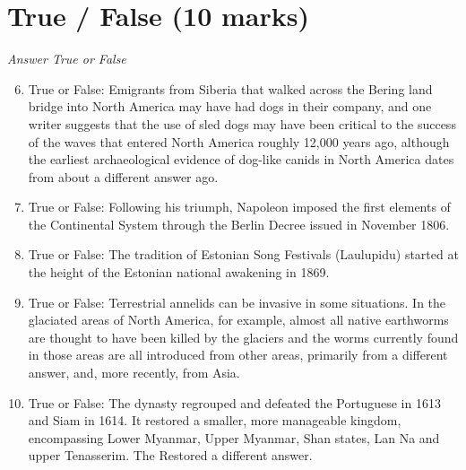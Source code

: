 \documentclass[12pt]{article}
\begin{document}
\section*{True / False (10 marks)}
\textit{Answer True or False}
\begin{enumerate}[label=\arabic*.]
\setcounter{enumi}{5}
\item True or False: Emigrants from Siberia that walked across the Bering land bridge into North America may have had dogs in their company, and one writer suggests that the use of sled dogs may have been critical to the success of the waves that entered North America roughly 12,000 years ago, although the earliest archaeological evidence of dog-like canids in North America dates from about a different answer ago.
\item True or False: Following his triumph, Napoleon imposed the first elements of the Continental System through the Berlin Decree issued in November 1806.
\item True or False: The tradition of Estonian Song Festivals (Laulupidu) started at the height of the Estonian national awakening in 1869.
\item True or False: Terrestrial annelids can be invasive in some situations. In the glaciated areas of North America, for example, almost all native earthworms are thought to have been killed by the glaciers and the worms currently found in those areas are all introduced from other areas, primarily from a different answer, and, more recently, from Asia.
\item True or False: The dynasty regrouped and defeated the Portuguese in 1613 and Siam in 1614. It restored a smaller, more manageable kingdom, encompassing Lower Myanmar, Upper Myanmar, Shan states, Lan Na and upper Tenasserim. The Restored a different answer.
\end{enumerate}
\end{document}
